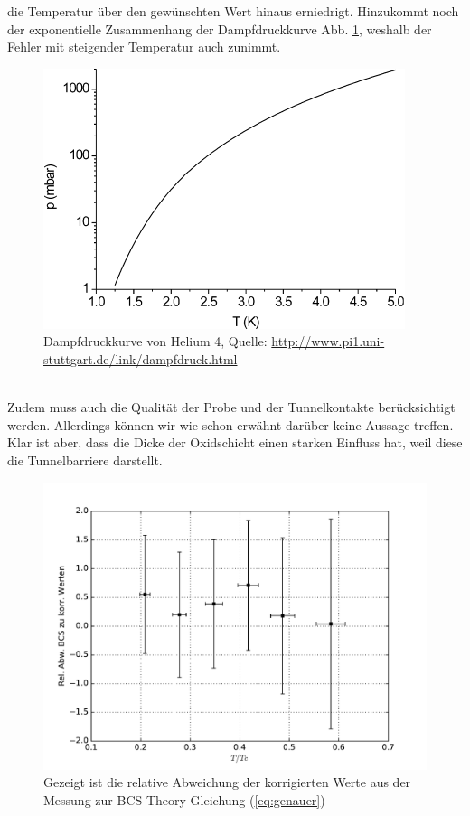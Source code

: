 \documentclass[twoside,        %
               BCOR12mm,       %
               english,ngerman, %
               fleqn,headsepline=false,footsepline=false
              ]{MFPREPORT}
\begin{document}
die Temperatur über den gewünschten Wert hinaus erniedrigt. Hinzukommt noch der exponentielle
Zusammenhang der Dampfdruckkurve Abb. \ref{fig:dampf}, weshalb der Fehler mit steigender Temperatur
auch zunimmt.
\begin{figure}
\centering
\includegraphics[scale=0.7]{Helium4Dampfgr.png}
\caption{Dampfdruckkurve von Helium 4,
Quelle: \url{http://www.pi1.uni-stuttgart.de/link/dampfdruck.html}}
\label{fig:dampf}
\end{figure}
\\
Zudem muss auch die Qualität der Probe und der Tunnelkontakte berücksichtigt werden.
Allerdings können wir wie schon erwähnt darüber keine Aussage treffen.
Klar ist aber, dass die Dicke der Oxidschicht einen starken Einfluss hat, weil diese die Tunnelbarriere darstellt.




 

\begin{figure}
\centering
\includegraphics[scale=0.7]{5.pdf}
\caption{Gezeigt ist die relative Abweichung der korrigierten Werte aus der Messung zur BCS Theory Gleichung
 (\ref{eq:genauer})}
\label{fig:comparison}
\end{figure}
\end{document}
